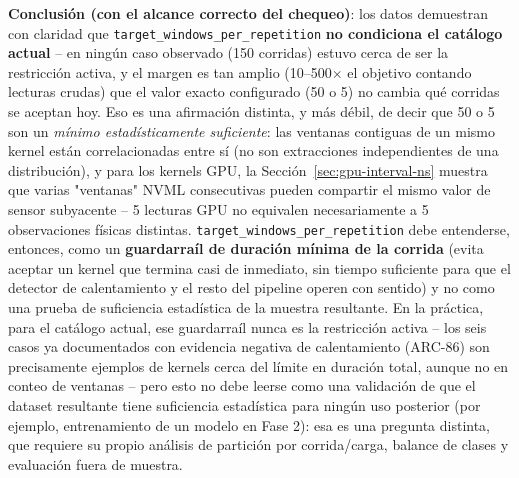 \textbf{Conclusión (con el alcance correcto del chequeo)}: los datos
demuestran con claridad que \texttt{target\_windows\_per\_repetition}
\textbf{no condiciona el catálogo actual} -- en ningún caso observado
(150 corridas) estuvo cerca de ser la restricción activa, y el margen es
tan amplio (10--500$\times$ el objetivo contando lecturas crudas) que el
valor exacto configurado (50 o 5) no cambia qué corridas se aceptan hoy.
Eso es una afirmación distinta, y más débil, de decir que 50 o 5 son un
\emph{mínimo estadísticamente suficiente}: las ventanas contiguas de un
mismo kernel están correlacionadas entre sí (no son extracciones
independientes de una distribución), y para los kernels GPU, la
Sección~\ref{sec:gpu-interval-ns} muestra que varias "ventanas" NVML
consecutivas pueden compartir el mismo valor de sensor subyacente -- 5
lecturas GPU no equivalen necesariamente a 5 observaciones físicas
distintas. \texttt{target\_windows\_per\_repetition} debe entenderse,
entonces, como un \textbf{guardarraíl de duración mínima de la corrida}
(evita aceptar un kernel que termina casi de inmediato, sin tiempo
suficiente para que el detector de calentamiento y el resto del pipeline
operen con sentido) y no como una prueba de suficiencia estadística de la
muestra resultante. En la práctica, para el catálogo actual, ese
guardarraíl nunca es la restricción activa -- los seis casos ya
documentados con evidencia negativa de calentamiento (ARC-86) son
precisamente ejemplos de kernels cerca del límite en duración total,
aunque no en conteo de ventanas -- pero esto no debe leerse como una
validación de que el dataset resultante tiene suficiencia estadística
para ningún uso posterior (por ejemplo, entrenamiento de un modelo en
Fase 2): esa es una pregunta distinta, que requiere su propio análisis
de partición por corrida/carga, balance de clases y evaluación fuera de
muestra.

